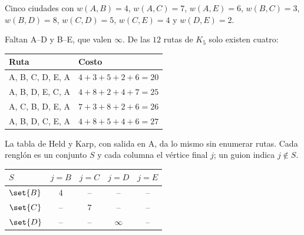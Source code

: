 \documentclass[11pt,letterpaper]{article}
\begin{document}
\begin{ejemplo}
  \label{ej:hamilton-tsp}
  Cinco ciudades con $w(A,B) = 4$, $w(A,C) = 7$, $w(A,E) = 6$,
  $w(B,C) = 3$, $w(B,D) = 8$, $w(C,D) = 5$, $w(C,E) = 4$ y
  $w(D,E) = 2$.
  \begin{center}
  \end{center}
  Faltan A--D y B--E, que valen $\infty$. De las $12$ rutas de $K_5$
  solo existen cuatro:
  \begin{center}
  \small
  \begin{tabular}{ll}
    \toprule
    \textbf{Ruta} & \textbf{Costo} \\
    \midrule
    A, B, C, D, E, A & $4 + 3 + 5 + 2 + 6 = 20$ \\
    A, B, D, E, C, A & $4 + 8 + 2 + 4 + 7 = 25$ \\
    A, C, B, D, E, A & $7 + 3 + 8 + 2 + 6 = 26$ \\
    A, B, D, C, E, A & $4 + 8 + 5 + 4 + 6 = 27$ \\
    \bottomrule
  \end{tabular}
  \end{center}
  La tabla de Held y Karp, con salida en A, da lo mismo sin enumerar
  rutas. Cada renglón es un conjunto $S$ y cada columna el vértice
  final $j$; un guion indica $j \notin S$.
  \begin{center}
  \small
  \begin{tabular}[t]{lcccc}
    \toprule
    $S$ & $j = B$ & $j = C$ & $j = D$ & $j = E$ \\
    \midrule
    $\set{B}$ & $4$ & -- & -- & -- \\
    $\set{C}$ & -- & $7$ & -- & -- \\
    $\set{D}$ & -- & -- & $\infty$ & -- \\

\end{tabular}
\end{center}
\end{ejemplo}
\end{document}
